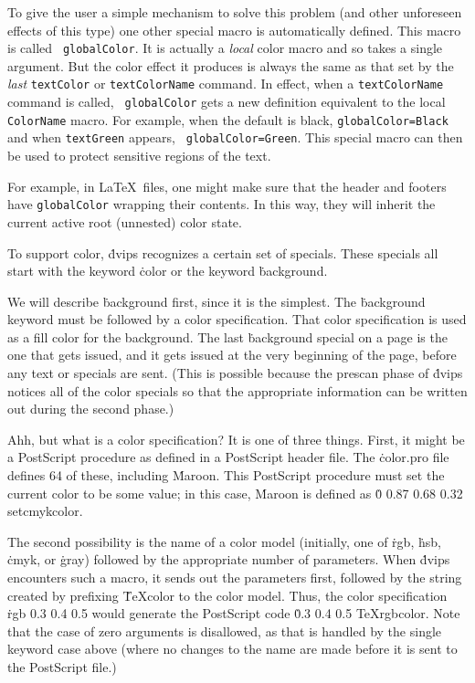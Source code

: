 To give the user a simple mechanism to solve this problem (and other
unforeseen effects of this type) one other special macro is
automatically defined.	This macro is called {\tt\ttbackslash
globalColor}.  It is actually a {\it local\/} color macro and so takes
a single argument.  But the color effect it produces is always the
same as that set by the {\it last\/} {\tt\ttbackslash textColor} or
{\tt\ttbackslash textColorName} command.  In effect, when a
{\tt\ttbackslash textColorName} command is called, {\tt\ttbackslash
globalColor} gets a new definition equivalent to the local
{\tt\ttbackslash ColorName} macro.  For example, when the default is
black, {\tt\ttbackslash globalColor=\ttbackslash Black} and when
{\tt\ttbackslash textGreen} appears, {\tt\ttbackslash
globalColor=\ttbackslash Green}.  This special macro can then be used
to protect sensitive regions of the text.

For example, in La\TeX\ files, one might make sure that the header and
footers have {\tt\ttbackslash globalColor} wrapping their contents.
In this way, they will inherit the current active root (unnested)
color state.


To support color, \.{dvips} recognizes a certain set of specials.
These specials all start with the keyword \.{color} or the keyword
\.{background}.

We will describe \.{background} first, since it is the simplest.
The \.{background} keyword must be followed by a color specification.
That color specification is used as a fill color for the background.
The last \.{background} special on a page is the one that gets issued,
and it gets issued at the very beginning of the page, before any
text or specials are sent.  (This is possible because the prescan
phase of \.{dvips} notices all of the color specials so that the
appropriate information can be written out during the second phase.)

Ahh, but what is a color specification?  It is one of three things.
First, it might be a PostScript procedure as defined in a PostScript header
file.  The \.{color.pro} file defines 64 of these, including
\.{Maroon}.  This PostScript procedure must set the current color to be
some value; in this case, \.{Maroon} is defined as
\.{0 0.87 0.68 0.32 setcmykcolor}.

The second possibility is the name of a color model (initially, one of
\.{rgb}, \.{hsb}, \.{cmyk}, or \.{gray}) followed by the appropriate
number of parameters.  When \.{dvips} encounters such a macro, it sends
out the parameters first, followed by the string created by prefixing
\.{TeXcolor} to the color model.  Thus, the color specification
\.{rgb 0.3 0.4 0.5} would generate the PostScript code \.{0.3 0.4 0.5
TeXrgbcolor}.  Note that the case of zero arguments is disallowed, as
that is handled by the single keyword case above (where no changes to
the name are made before it is sent to the PostScript file.)

